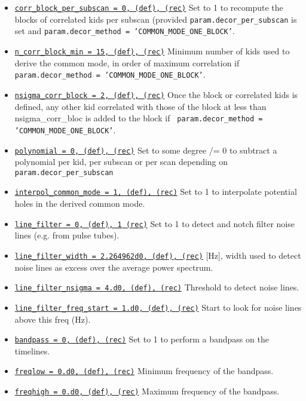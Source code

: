 \documentclass[a4paper,10pt]{article}
\begin{document}
\begin{itemize}
\item \underline{\tt corr\_block\_per\_subscan = 0, (def), (rec)} Set to 1 to
  recompute the blocks of correlated kids per subscan (provided
  {\tt param.decor\_per\_subscan} is set and {\tt param.decor\_method =
    'COMMON\_MODE\_ONE\_BLOCK'}.

\item \underline{\tt n\_corr\_block\_min = 15, (def), (rec)}  Minimum number of
  kids used to derive the common mode, in order of maximum correlation if {\tt
    param.decor\_method = 'COMMON\_MODE\_ONE\_BLOCK'}.
\item \underline{\tt nsigma\_corr\_block = 2, (def), (rec)} Once the block or
  correlated kids is defined, any other kid correlated with those of the block
  at less than nsigma\_corr\_bloc is added to the block if {\tt
    param.decor\_method = 'COMMON\_MODE\_ONE\_BLOCK'}.

\item \underline{\tt polynomial = 0, (def), (rec)} Set to some degree /= 0 to
  subtract a polynomial per kid, per subscan or per scan depending on {\tt
    param.decor\_per\_subscan}

\item \underline{\tt interpol\_common\_mode = 1, (def), (rec)} Set to 1 to interpolate potential holes in the derived common mode.

\item \underline{\tt line\_filter = 0, (def), 1 (rec)} Set to 1 to detect and
  notch filter noise lines (e.g. from pulse tubes).
\item \underline{\tt line\_filter\_width = 2.264962d0, (def), (rec)}  [Hz], width
  used to detect noise lines as excess over the average power spectrum.
\item \underline{\tt line\_filter\_nsigma = 4.d0, (def), (rec)} Threshold to detect noise lines.
\item \underline{\tt line\_filter\_freq\_start = 1.d0, (def), (rec)} Start to look for noise lines above this freq (Hz).
\item \underline{\tt bandpass = 0, (def), (rec)}  Set to 1 to perform a bandpass
  on the timelines.
\item \underline{\tt freqlow = 0.d0, (def), (rec)} Minimum frequency of the bandpass.
\item \underline{\tt freqhigh = 0.d0, (def), (rec)} Maximum frequency of the bandpass.


\end{itemize}
\end{document}
